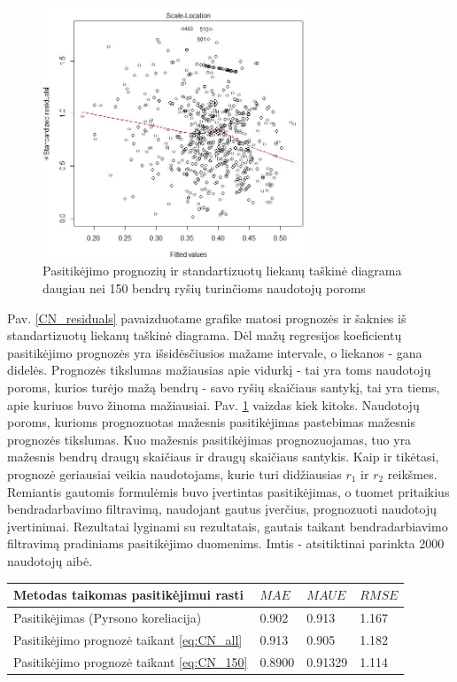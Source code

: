 \documentclass{VUMIFInfMagistrinis}
\begin{document}
\begin{figure}[ht!]
	\centering
	\includegraphics[width=80mm]{CN_residuals_150.jpg}
	\caption{Pasitikėjimo prognozių ir standartizuotų liekanų taškinė diagrama daugiau nei 150 bendrų ryšių turinčioms naudotojų poroms} \label{CN_residuals_150}
\end{figure}
Pav. \ref{CN_residuals} pavaizduotame grafike matosi prognozės ir šaknies iš standartizuotų liekanų taškinė diagrama. Dėl mažų regresijos koeficientų pasitikėjimo prognozės yra išsidėsčiusios mažame intervale, o liekanos - gana didelės. Prognozės tikslumas mažiausias apie vidurkį - tai yra toms naudotojų poroms, kurios turėjo mažą bendrų - savo ryšių skaičiaus santykį, tai yra tiems, apie kuriuos buvo žinoma mažiausiai. Pav. \ref{CN_residuals_150} vaizdas kiek kitoks. Naudotojų poroms, kurioms prognozuotas mažesnis pasitikėjimas pastebimas mažesnis prognozės tikslumas. Kuo mažesnis pasitikėjimas prognozuojamas, tuo yra mažesnis bendrų draugų skaičiaus ir draugų skaičiaus santykis. Kaip ir tikėtasi, prognozė geriausiai veikia naudotojams, kurie turi didžiausias $r_1$ ir $r_2$ reikšmes.
\newline
\indent
Remiantis gautomis formulėmis buvo įvertintas pasitikėjimas, o tuomet pritaikius bendradarbavimo filtravimą, naudojant gautus įverčius, prognozuoti naudotojų įvertinimai. Rezultatai lyginami su rezultatais, gautais taikant bendradarbiavimo filtravimą pradiniams pasitikėjimo duomenims. Imtis - atsitiktinai parinkta 2000 naudotojų aibė. 
\begin{center}
	\begin{tabular}{ | l | l | l | l | }
		\hline
		Metodas taikomas pasitikėjimui rasti & $MAE$ & $MAUE$ & $RMSE$\\ \hline
		Pasitikėjimas (Pyrsono koreliacija)        & 0.902 & 0.913 & 1.167  \\ \hline
		Pasitikėjimo prognozė taikant \ref{eq:CN_all}	  					& 0.913 & 0.905 & 1.182  \\ \hline
		Pasitikėjimo prognozė taikant \ref{eq:CN_150} 					& 0.8900 & 0.91329 & 1.114  \\ \hline
		\hline
	\end{tabular}
\end{center}
\end{document}
